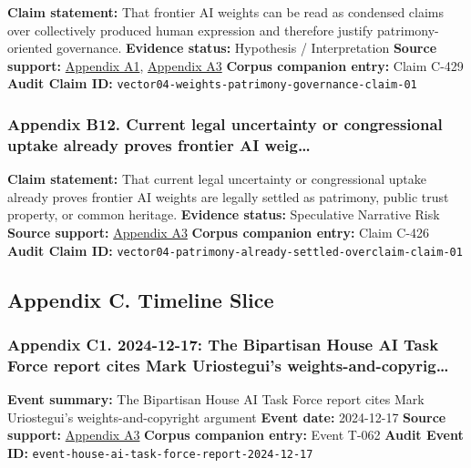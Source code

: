 \documentclass[
  american,
  11pt,
  letterpaper,
]{article}
\begin{document}
\textbf{Claim statement:} That frontier AI weights can be read as
condensed claims over collectively produced human expression and
therefore justify patrimony-oriented governance. \textbf{Evidence
status:} Hypothesis / Interpretation \textbf{Source support:}
\hyperref[appendix-a1-ai-copyright-weights-a-new-frontier-in-intellectual-property-law]{Appendix
A1},
\hyperref[appendix-a3-bipartisan-house-task-force-report-on-artificial-intelligence]{Appendix
A3} \textbf{Corpus companion entry:} Claim C-429 \textbf{Audit Claim
ID:} \texttt{vector04-weights-patrimony-governance-claim-01}

\subsubsection{Appendix B12. Current legal uncertainty or congressional
uptake already proves frontier AI
weig\ldots{}}\label{appendix-b12-current-legal-uncertainty-or-congressional-uptake-already-proves-frontier-ai-weig}

\textbf{Claim statement:} That current legal uncertainty or
congressional uptake already proves frontier AI weights are legally
settled as patrimony, public trust property, or common heritage.
\textbf{Evidence status:} Speculative Narrative Risk \textbf{Source
support:}
\hyperref[appendix-a3-bipartisan-house-task-force-report-on-artificial-intelligence]{Appendix
A3} \textbf{Corpus companion entry:} Claim C-426 \textbf{Audit Claim
ID:} \texttt{vector04-patrimony-already-settled-overclaim-claim-01}

\subsection{Appendix C. Timeline
Slice}\label{appendix-c.-timeline-slice}

\subsubsection{Appendix C1. 2024-12-17: The Bipartisan House AI Task
Force report cites Mark Uriostegui's
weights-and-copyrig\ldots{}}\label{appendix-c1-2024-12-17-the-bipartisan-house-ai-task-force-report-cites-mark-uriostegui-s-weights-and-copyright-argument}

\textbf{Event summary:} The Bipartisan House AI Task Force report cites
Mark Uriostegui's weights-and-copyright argument \textbf{Event date:}
2024-12-17 \textbf{Source support:}
\hyperref[appendix-a3-bipartisan-house-task-force-report-on-artificial-intelligence]{Appendix
A3} \textbf{Corpus companion entry:} Event T-062 \textbf{Audit Event
ID:} \texttt{event-house-ai-task-force-report-2024-12-17}
\end{document}
